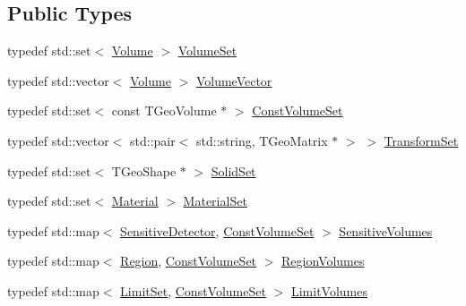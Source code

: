 \subsection*{Public Types}
\begin{DoxyCompactItemize}
\item 
typedef std\+::set$<$ \hyperlink{class_d_d4hep_1_1_geometry_1_1_volume}{Volume} $>$ \hyperlink{class_d_d4hep_1_1_geometry_1_1_geo_handler_types_a87ea3b22bdfe08f1a4afca3d58fd8ca0}{Volume\+Set}
\item 
typedef std\+::vector$<$ \hyperlink{class_d_d4hep_1_1_geometry_1_1_volume}{Volume} $>$ \hyperlink{class_d_d4hep_1_1_geometry_1_1_geo_handler_types_a6713619ef278692ebdf9f6ee4a3f32de}{Volume\+Vector}
\item 
typedef std\+::set$<$ const T\+Geo\+Volume $\ast$ $>$ \hyperlink{class_d_d4hep_1_1_geometry_1_1_geo_handler_types_ae294545274767eb8cf886a303033b351}{Const\+Volume\+Set}
\item 
typedef std\+::vector$<$ std\+::pair$<$ std\+::string, T\+Geo\+Matrix $\ast$ $>$ $>$ \hyperlink{class_d_d4hep_1_1_geometry_1_1_geo_handler_types_aa52b3113e87db04c37666e85a9b5e569}{Transform\+Set}
\item 
typedef std\+::set$<$ T\+Geo\+Shape $\ast$ $>$ \hyperlink{class_d_d4hep_1_1_geometry_1_1_geo_handler_types_a85d065cdf670a4f9ea9c0c4dee921fce}{Solid\+Set}
\item 
typedef std\+::set$<$ \hyperlink{class_d_d4hep_1_1_geometry_1_1_material}{Material} $>$ \hyperlink{class_d_d4hep_1_1_geometry_1_1_geo_handler_types_a2cb3f04bc3529531d1559173eea5f7b5}{Material\+Set}
\item 
typedef std\+::map$<$ \hyperlink{class_d_d4hep_1_1_geometry_1_1_sensitive_detector}{Sensitive\+Detector}, \hyperlink{class_d_d4hep_1_1_geometry_1_1_geo_handler_types_ae294545274767eb8cf886a303033b351}{Const\+Volume\+Set} $>$ \hyperlink{class_d_d4hep_1_1_geometry_1_1_geo_handler_types_a530cdc551e68a5f975fe294329d27e63}{Sensitive\+Volumes}
\item 
typedef std\+::map$<$ \hyperlink{class_d_d4hep_1_1_geometry_1_1_region}{Region}, \hyperlink{class_d_d4hep_1_1_geometry_1_1_geo_handler_types_ae294545274767eb8cf886a303033b351}{Const\+Volume\+Set} $>$ \hyperlink{class_d_d4hep_1_1_geometry_1_1_geo_handler_types_a8e121c3a06f16781bbabba4528136654}{Region\+Volumes}
\item 
typedef std\+::map$<$ \hyperlink{class_d_d4hep_1_1_geometry_1_1_limit_set}{Limit\+Set}, \hyperlink{class_d_d4hep_1_1_geometry_1_1_geo_handler_types_ae294545274767eb8cf886a303033b351}{Const\+Volume\+Set} $>$ \hyperlink{class_d_d4hep_1_1_geometry_1_1_geo_handler_types_ad8397c24589a1508baf0735bdb2b3c77}{Limit\+Volumes}

\end{DoxyCompactItemize}
